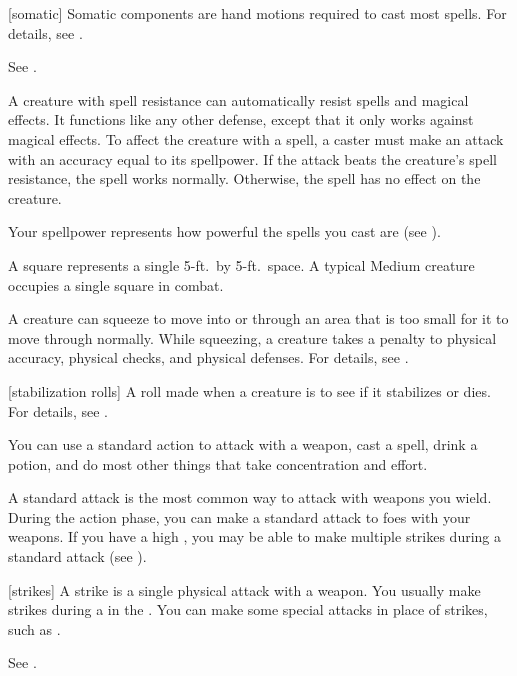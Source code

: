 [somatic] Somatic components are hand motions required to cast most spells.
For details, see .

 See .

 A creature with spell resistance can automatically resist spells and magical effects.
It functions like any other defense, except that it only works against magical effects.
To affect the creature with a spell, a caster must make an attack with an accuracy equal to its spellpower.
If the attack beats the creature's spell resistance, the spell works normally.
Otherwise, the spell has no effect on the creature.

 Your spellpower represents how powerful the spells you cast are (see ).

 A square represents a single 5-ft.\ by 5-ft.\ space.
A typical Medium creature occupies a single square in combat.

 A creature can squeeze to move into or through an area that is too small for it to move through normally.
While squeezing, a creature takes a  penalty to physical accuracy, physical checks, and physical defenses.
For details, see .

[stabilization rolls] A roll made when a creature is  to see if it stabilizes or dies. For details, see .

 You can use a standard action to attack with a weapon, cast a spell, drink a potion, and do most other things that take concentration and effort.

 A standard attack is the most common way to attack with weapons you wield.
During the action phase, you can make a standard attack to  foes with your weapons.
If you have a high , you may be able to make multiple strikes during a standard attack (see ).

[strikes] A strike is a single physical attack with a weapon.
You usually make strikes during a  in the .
You can make some special attacks in place of strikes, such as .

 See .

